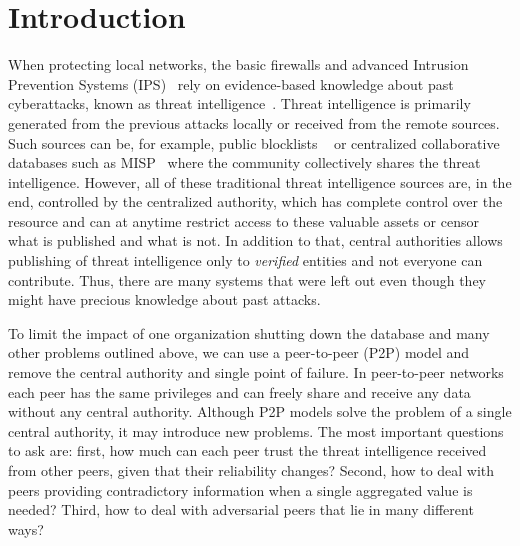 \chapter{Introduction}
\label{ch:introduction}



When protecting local networks, the basic firewalls and advanced Intrusion Prevention Systems (IPS)~\cite{zhang2004intrusion} rely on evidence-based knowledge about past cyberattacks, known as threat intelligence~\cite{threatintelligence}. Threat intelligence is primarily generated from the previous attacks locally or received from the remote sources.
Such sources can be, for example, public blocklists ~\cite{abuseipdb, dataplane, binarydefense} or centralized collaborative databases such as MISP~\cite{wagner2016misp} where the community collectively shares the threat intelligence.
However, all of these traditional threat intelligence sources are, in the end, controlled by the centralized authority, which has complete control over the resource and can at anytime restrict access to these valuable assets or censor what is published and what is not.
In addition to that, central authorities allows publishing of threat intelligence only to \textit{verified} entities and not everyone can contribute. Thus, there are many systems that were left out even though they might have precious knowledge about past attacks.

To limit the impact of one organization shutting down the database and many other problems outlined above, we can use a peer-to-peer (P2P) model and remove the central authority and single point of failure.
In peer-to-peer networks each peer has the same privileges and can freely share and receive any data without any central authority.
Although P2P models solve the problem of a single central authority, it may introduce new problems. The most important questions to ask are: first, how much can each peer trust the threat intelligence received from other peers, given that their reliability changes? Second, how to deal with peers providing contradictory information when a single aggregated value is needed? Third, how to deal with adversarial peers that lie in many different ways?

